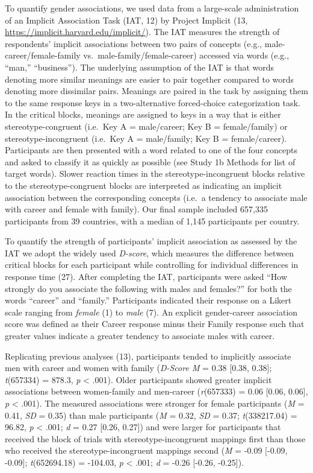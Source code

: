 \documentclass[9pt,twocolumn]{pnas-new}
\begin{document}
To quantify gender associations, we used data from a large-scale administration of an Implicit Association Task (IAT, 12)  by Project Implicit (13, \url{https://implicit.harvard.edu/implicit/}). The IAT measures the strength of respondents' implicit associations between two pairs of concepts (e.g., male-career/female-family vs.~male-family/female-career) accessed via
words (e.g., \enquote{man,} \enquote{business}). The underlying
assumption of the IAT is that words denoting more similar meanings
are easier to pair together compared to words denoting more dissimilar pairs. Meanings are paired in the task by assigning them to the same response
keys in a two-alternative forced-choice categorization task. In the
critical blocks, meanings are assigned to keys in a way that
is either stereotype-congruent (i.e.~Key A = male/career; Key B =
female/family) or stereotype-incongruent (i.e.~Key A = male/family; Key B =
female/career). Participants are then presented with a word related to
one of the four concepts and asked to classify it as quickly as possible
(see Study 1b Methods for list of target words). Slower reaction times
in the stereotype-incongruent blocks relative to the stereotype-congruent blocks are
interpreted as indicating an implicit association between the
corresponding concepts (i.e.~a tendency to associate male with career and
female with family). Our final sample included 657,335 participants from 39 countries, with a
median of 1,145 participants per country.

To quantify the strength of participants’ implicit association as assessed by the IAT we adopt the widely used  \emph{D-score}, which measures the difference between critical blocks for each participant while controlling for individual differences
in response time (27). After completing
the IAT, participants were asked \enquote{How strongly do you associate
the following with males and females?} for both the words
\enquote{career} and \enquote{family.} Participants indicated their
response on a Likert scale ranging from \emph{female} (1) to \emph{male}
(7). An explicit gender-career association score was defined as their Career response minus their Family response such that greater values indicate a greater tendency to associate males with career.

Replicating previous analyses (13), participants tended to implicitly associate men with career and women with family (\emph{D-Score M} = 0.38 {[}0.38, 0.38{]}; \emph{t}(657334) = 878.3, \emph{p} \textless{} .001). Older participants showed greater implicit associations between women-family and men-career  (\emph{r}(657333) = 0.06 {[}0.06, 0.06{]}, \emph{p} \textless{} .001).  The measured associations were stronger for female participants (\emph{M} = 0.41, \emph{SD} = 0.35) than male participants
(\emph{M} = 0.32, \emph{SD} = 0.37; \emph{t}(338217.04) = 96.82, \emph{p} \textless{} .001; \emph{d} = 0.27 {[}0.26, 0.27{]}) and were larger for participants that received the block of trials with stereotype-incongruent mappings first than those who received the stereotype-incongruent mappings second (\emph{M} = -0.09 {[}-0.09, -0.09{]}; \emph{t}(652694.18) = -104.03, \emph{p} \textless{} .001; \emph{d} = -0.26 {[}-0.26, -0.25{]}). 
\end{document}
